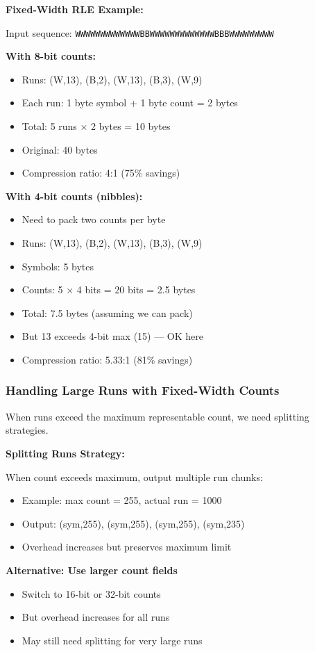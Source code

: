 \begin{examplebox}
\textbf{Fixed-Width RLE Example:}

Input sequence: \texttt{WWWWWWWWWWWWWBBWWWWWWWWWWWWWBBBWWWWWWWWW}

\textbf{With 8-bit counts:}
\begin{itemize}
    \item Runs: (W,13), (B,2), (W,13), (B,3), (W,9)
    \item Each run: 1 byte symbol + 1 byte count = 2 bytes
    \item Total: 5 runs × 2 bytes = 10 bytes
    \item Original: 40 bytes
    \item Compression ratio: 4:1 (75\% savings)
\end{itemize}

\textbf{With 4-bit counts (nibbles):}
\begin{itemize}
    \item Need to pack two counts per byte
    \item Runs: (W,13), (B,2), (W,13), (B,3), (W,9)
    \item Symbols: 5 bytes
    \item Counts: 5 × 4 bits = 20 bits = 2.5 bytes
    \item Total: 7.5 bytes (assuming we can pack)
    \item But 13 exceeds 4-bit max (15) — OK here
    \item Compression ratio: 5.33:1 (81\% savings)
\end{itemize}
\end{examplebox}

\subsubsection{Handling Large Runs with Fixed-Width Counts}

When runs exceed the maximum representable count, we need splitting strategies.

\begin{importantbox}
\textbf{Splitting Runs Strategy:}

When count exceeds maximum, output multiple run chunks:
\begin{itemize}
    \item Example: max count = 255, actual run = 1000
    \item Output: (sym,255), (sym,255), (sym,255), (sym,235)
    \item Overhead increases but preserves maximum limit
\end{itemize}

\textbf{Alternative: Use larger count fields}
\begin{itemize}
    \item Switch to 16-bit or 32-bit counts
    \item But overhead increases for all runs
    \item May still need splitting for very large runs
\end{itemize}
\end{importantbox}

